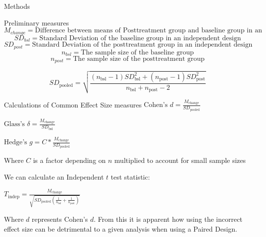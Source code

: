 \documentclass[
  ignorenonframetext,
  aspectratio=169,
]{beamer}
\begin{document}
\begin{frame}{Methods}
\protect\hypertarget{methods}{}
\begin{block}{Preliminary measures}
\protect\hypertarget{preliminary-measures}{}
\[
M_{change}=\text{Difference between means of Posttreatment group and baseline group in an independent design }
\] \[
SD_{bsl}={\text{Standard Deviation of the baseline group in an independent design}}
\] \[
SD_{post}={\text{Standard Deviation of the posttreatment group in an independent design}}
\] \[
n_{bsl}= \text{The sample size of the baseline group}
\] \[
n_{post}= \text{The sample size of the posttreatment group}
\]

\[
SD_\text{pooled}=\sqrt{\frac{(n_{\text{bsl}}-1)SD_{\text{bsl}}^2+(n_{\text{post}}-1)SD^2_{\text{post}}}{
n_{\text{bsl}}+n_{\text{post}}-2}}
\]
\end{block}
\end{frame}

\begin{frame}{Calculations of Common Effect Size measures}
\protect\hypertarget{calculations-of-common-effect-size-measures}{}
\(\text{Cohen's } d= \frac{M_\text{change}}{SD_\text{pooled}}\)

\(\text{Glass's } \delta = \frac{M_\text{change}}{SD_{\text{bsl}}}\)

\(\text{Hedge's }g= C*\frac{M_\text{change}}{SD_\text{pooled}}\)

Where \(C\) is a factor depending on \(n\) multiplied to account for
small sample sizes

We can calculate an Independent \(t\) test statistic:

\(T_\text{indep}= \frac{M_{\text{change}}}{\sqrt{SD_{\text{pooled}}(\frac{1}{n_\text{bsl}}+\frac{1}{n_{\text{post}}})}}\)

Where \(d\) represents Cohen's \(d\). From this it is apparent how using
the incorrect effect size can be detrimental to a given analysis when
using a Paired Design.
\end{frame}
\end{document}
